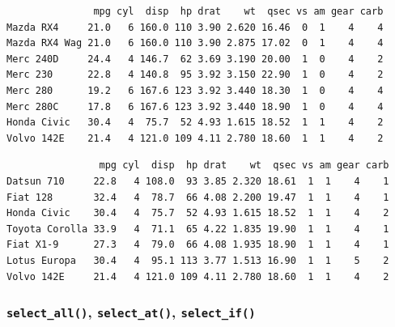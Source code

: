 \documentclass[
  11pt,
]{krantz}
\newenvironment{Shaded}{\begin{snugshade}}{\end{snugshade}}
\newcommand{\CommentTok}[1]{\textcolor[rgb]{0.37,0.37,0.37}{\textit{#1}}}
\newcommand{\DecValTok}[1]{\textcolor[rgb]{0.06,0.06,0.06}{#1}}
\newcommand{\KeywordTok}[1]{\textcolor[rgb]{0.27,0.27,0.27}{\textbf{#1}}}
\newcommand{\NormalTok}[1]{#1}
\newcommand{\OperatorTok}[1]{\textcolor[rgb]{0.43,0.43,0.43}{\textbf{#1}}}
\newcommand{\StringTok}[1]{\textcolor[rgb]{0.5,0.5,0.5}{#1}}
\begin{document}
\begin{verbatim}
               mpg cyl  disp  hp drat    wt  qsec vs am gear carb
Mazda RX4     21.0   6 160.0 110 3.90 2.620 16.46  0  1    4    4
Mazda RX4 Wag 21.0   6 160.0 110 3.90 2.875 17.02  0  1    4    4
Merc 240D     24.4   4 146.7  62 3.69 3.190 20.00  1  0    4    2
Merc 230      22.8   4 140.8  95 3.92 3.150 22.90  1  0    4    2
Merc 280      19.2   6 167.6 123 3.92 3.440 18.30  1  0    4    4
Merc 280C     17.8   6 167.6 123 3.92 3.440 18.90  1  0    4    4
Honda Civic   30.4   4  75.7  52 4.93 1.615 18.52  1  1    4    2
Volvo 142E    21.4   4 121.0 109 4.11 2.780 18.60  1  1    4    2
\end{verbatim}

\begin{Shaded}
\end{Shaded}

\begin{verbatim}
                mpg cyl  disp  hp drat    wt  qsec vs am gear carb
Datsun 710     22.8   4 108.0  93 3.85 2.320 18.61  1  1    4    1
Fiat 128       32.4   4  78.7  66 4.08 2.200 19.47  1  1    4    1
Honda Civic    30.4   4  75.7  52 4.93 1.615 18.52  1  1    4    2
Toyota Corolla 33.9   4  71.1  65 4.22 1.835 19.90  1  1    4    1
Fiat X1-9      27.3   4  79.0  66 4.08 1.935 18.90  1  1    4    1
Lotus Europa   30.4   4  95.1 113 3.77 1.513 16.90  1  1    5    2
Volvo 142E     21.4   4 121.0 109 4.11 2.780 18.60  1  1    4    2
\end{verbatim}

\normalsize

\hypertarget{select-variant}{%
\subsubsection*{\texorpdfstring{\texttt{select\_all()}, \texttt{select\_at()}, \texttt{select\_if()}}{select\_all(), select\_at(), select\_if()}}\label{select-variant}}
\end{document}

